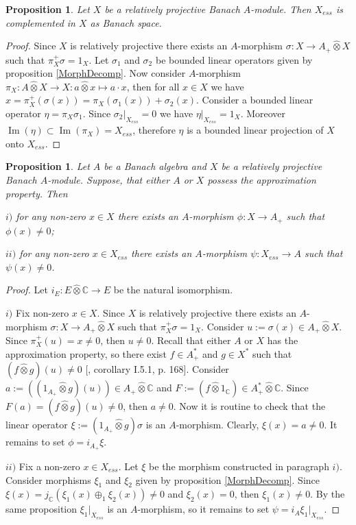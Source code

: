 \documentclass[12pt]{article}
\newtheorem{proposition}[theorem]{Proposition}
\newcommand{\projtens}{\mathbin{\widehat{\otimes}}}
\begin{document}
\begin{proposition}\label{ProjModEssPartCompl} Let $X$ be a relatively projective Banach $A$-module. Then $X_{ess}$ is complemented in $X$ as Banach space.
\end{proposition}
\begin{proof} Since $X$ is relatively projective there exists an $A$-morphism $\sigma:X\to A_+\projtens X$ such that $\pi_X^+\sigma=1_X$. Let $\sigma_1$ and $\sigma_2$ be bounded linear operators given by proposition \ref{MorphDecomp}. Now consider $A$-morphism $\pi_X:A\projtens X\to X:a\projtens x\mapsto a\cdot x$, then for all $x\in X$ we have $x=\pi_X^+(\sigma(x))=\pi_X(\sigma_1(x)) + \sigma_2(x)$. Consider a bounded linear operator $\eta = \pi_X\sigma_1$. Since $\sigma_2|_{X_{ess}}=0$ we have $\eta|_{X_{ess}}=1_X$. Moreover $\operatorname{Im}(\eta)\subset\operatorname{Im}(\pi_X)=X_{ess}$, therefore $\eta$ is a bounded linear projection of $X$ onto $X_{ess}$.
\end{proof}

\begin{proposition}\label{RelProjNecesCond} Let $A$ be a Banach algebra and $X$ be a relatively projective Banach $A$-module. Suppose, that either $A$ or $X$ possess the approximation property. Then

    $i)$ for any non-zero $x\in X$ there exists an $A$-morphism $\phi:X\to A_+$ such that $\phi(x)\neq 0$;

    $ii)$ for any non-zero $x\in X_{ess}$ there exists an $A$-morphism $\psi:X_{ess}\to A$ such that $\psi(x)\neq 0$.
\end{proposition}
\begin{proof} Let $i_E:E\projtens \mathbb{C}\to E$ be the natural isomorphism.

    $i)$ Fix non-zero $x\in X$. Since $X$ is relatively projective there exists an $A$-morphism $\sigma:X\to A_+\projtens X$ such that $\pi_X^+\sigma=1_X$. Consider $u:=\sigma(x)\in A_+\projtens X$. Since $\pi_X^+(u)=x\neq 0$, then $u\neq 0$. Recall that either $A$ or $X$ has the approximation property, so there exist $f\in A_+^*$ and $g\in X^*$ such that $(f\projtens g)(u)\neq 0$ [\cite{GrothProdTenTopNucl}, corollary I.5.1, p. 168]. Consider $a:=((1_{A_+}\projtens g)(u))\in A_+\projtens\mathbb{C}$ and $F:=(f\projtens 1_{\mathbb{C}})\in A_+^*\projtens\mathbb{C}$. Since $F(a)=(f\projtens g)(u)\neq 0$, then $a\neq 0$. Now it is routine to check that the linear operator $\xi:=(1_{A_+}\projtens g)\sigma$ is an $A$-morphism. Clearly, $\xi(x)=a\neq 0$. It remains to set $\phi=i_{A_+}\xi$.

    $ii)$ Fix a non-zero $x\in X_{ess}$. Let $\xi$ be the morphism constructed in paragraph $i)$. Consider morphisms $\xi_1$ and $\xi_2$ given by proposition \ref{MorphDecomp}. Since $\xi(x)=j_{\mathbb{C}}(\xi_1(x)\oplus_1\xi_2(x))\neq 0$ and $\xi_2(x)=0$, then $\xi_1(x)\neq 0$. By the same proposition $\xi_1|_{X_{ess}}$ is an $A$-morphism, so it remains to set $\psi=i_A \xi_1|_{X_{ess}}$.

\end{proof}
\end{document}

